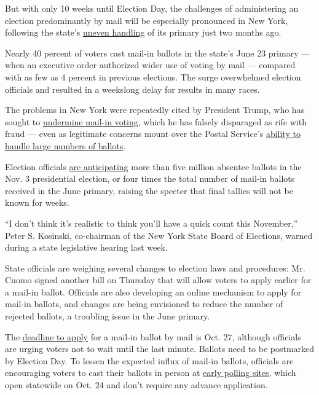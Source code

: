 But with only 10 weeks until Election Day, the challenges of
administering an election predominantly by mail will be especially
pronounced in New York, following the state's
\href{https://www.nytimes3xbfgragh.onion/2020/07/17/nyregion/election-absentee-ballots-primary.html}{uneven
handling} of its primary just two months ago.

Nearly 40 percent of voters cast mail-in ballots in the state's June 23
primary --- when an executive order authorized wider use of voting by
mail --- compared with as few as 4 percent in previous elections. The
surge overwhelmed election officials and resulted in a weekslong delay
for results in many races.

The problems in New York were repeatedly cited by President Trump, who
has sought to
\href{https://www.nytimes3xbfgragh.onion/2020/08/03/us/politics/trump-mail-in-voting.html}{undermine
mail-in voting}, which he has falsely disparaged as rife with fraud ---
even as legitimate concerns mount over the Postal Service's
\href{https://www.nytimes3xbfgragh.onion/2020/08/17/us/politics/postal-service-voting.html}{ability
to handle large numbers of ballots}.

Election officials
\href{https://twitter.com/luisferre/status/1293216219550679041}{are
anticipating} more than five million absentee ballots in the Nov. 3
presidential election, or four times the total number of mail-in ballots
received in the June primary, raising the specter that final tallies
will not be known for weeks.

``I don't think it's realistic to think you'll have a quick count this
November,'' Peter S. Kosinski, co-chairman of the New York State Board
of Elections, warned during a state legislative hearing last week.

State officials are weighing several changes to election laws and
procedures: Mr. Cuomo signed another bill on Thursday that will allow
voters to apply earlier for a mail-in ballot. Officials are also
developing an online mechanism to apply for mail-in ballots, and changes
are being envisioned to reduce the number of rejected ballots, a
troubling issue in the June primary.

The \href{https://www.elections.ny.gov/votingdeadlines.html}{deadline to
apply} for a mail-in ballot by mail is Oct. 27, although officials are
urging voters not to wait until the last minute. Ballots need to be
postmarked by Election Day. To lessen the expected influx of mail-in
ballots, officials are encouraging voters to cast their ballots in
person at
\href{https://newyork.cbslocal.com/2020/08/19/nyc-early-voting/}{early
polling sites}, which open statewide on Oct. 24 and don't require any
advance application.

